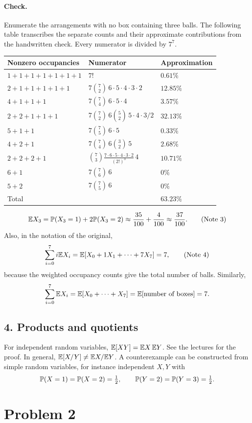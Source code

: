 \documentclass[11pt,a4paper]{article}
\begin{document}
\paragraph{Check.}
Enumerate the arrangements with no box containing three balls. The following table transcribes the separate counts and their approximate contributions from the handwritten check. Every numerator is divided by $7^7$.
\begin{center}\small
\begin{tabular}{lll}
Nonzero occupancies & Numerator & Approximation\\\hline
$1+1+1+1+1+1+1$ & $7!$ & $0.61\%$\\[3pt]
$2+1+1+1+1+1$ & $7\binom72\,6\cdot5\cdot4\cdot3\cdot2$ & $12.85\%$\\[3pt]
$4+1+1+1$ & $7\binom74\,6\cdot5\cdot4$ & $3.57\%$\\[3pt]
$2+2+1+1+1$ & $7\binom72\,6\binom52\,5\cdot4\cdot3/2$ & $32.13\%$\\[3pt]
$5+1+1$ & $7\binom75\,6\cdot5$ & $0.33\%$\\[3pt]
$4+2+1$ & $7\binom74\,6\binom32\,5$ & $2.68\%$\\[3pt]
$2+2+2+1$ & $\binom73\frac{7\cdot6\cdot5\cdot4\cdot3\cdot2}{(2!)^3}\,4$ & $10.71\%$\\[3pt]
$6+1$ & $7\binom76\,6$ & $0\%$\\[3pt]
$5+2$ & $7\binom75\,6$ & $0\%$\\\hline
Total & & $63.23\%$
\end{tabular}
\end{center}
\[
\E X_3=\P(X_3=1)+2\P(X_3=2)
\approx\frac{35}{100}+\frac4{100}\approx\frac{37}{100}.\tag{Note 3}
\]
Also, in the notation of the original,
\[
\sum_{i=0}^7i\E X_i=\E[X_0+1X_1+\cdots+7X_7]=7,\tag{Note 4}
\]
because the weighted occupancy counts give the total number of balls.
Similarly,
\[
\sum_{i=0}^7\E X_i=\E[X_0+\cdots+X_7]
=\E[\text{number of boxes}]=7.
\]

\subsection*{4. Products and quotients}
For independent random variables, $\E[XY]=\E X\,\E Y$. See the lectures for the proof.
In general, $\E[X/Y]\ne\E X/\E Y$. A counterexample can be constructed from simple random variables, for instance independent $X,Y$ with
\[
\P(X=1)=\P(X=2)=\tfrac12,\qquad
\P(Y=2)=\P(Y=3)=\tfrac12.
\]

\section*{Problem 2}
\end{document}
